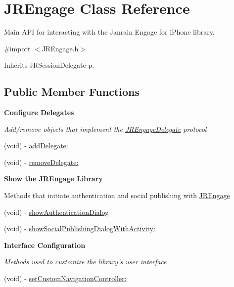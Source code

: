 \hypertarget{interface_j_r_engage}{
\section{JREngage Class Reference}
\label{interface_j_r_engage}
}


Main API for interacting with the Janrain Engage for iPhone library.  




{\ttfamily \#import $<$JREngage.h$>$}



Inherits JRSessionDelegate-\/p.

\subsection*{Public Member Functions}
\begin{Indent}{\bf Configure Delegates}\par
{\em \label{_amgrp3140c41a20ac51608ddd4bec38533a8f}
 Add/remove objects that implement the \hyperlink{protocol_j_r_engage_delegate-p}{JREngageDelegate} protocol }\begin{DoxyCompactItemize}
\item 
(void) -\/ \hyperlink{interface_j_r_engage_a18377ffb55f821587e6d38b3489692e8}{addDelegate:}
\item 
(void) -\/ \hyperlink{interface_j_r_engage_ab3f12ac148ea0f6df4d7ff7789cc7c94}{removeDelegate:}
\end{DoxyCompactItemize}
\end{Indent}
\begin{Indent}{\bf Show the JREngage Library}\par
{\em \label{_amgrpf9e79eb521c10019ba1736bc57a0355e}
 \label{interface_j_r_engage_showMethods}
\hypertarget{interface_j_r_engage_showMethods}{}


Methods that initiate authentication and social publishing with \hyperlink{interface_j_r_engage}{JREngage} }\begin{DoxyCompactItemize}
\item 
(void) -\/ \hyperlink{interface_j_r_engage_a01ecdff491f91543e18f33d0e565b046}{showAuthenticationDialog}
\item 
(void) -\/ \hyperlink{interface_j_r_engage_afca7b5ab9a57edc1a460aaec882207c4}{showSocialPublishingDialogWithActivity:}
\end{DoxyCompactItemize}
\end{Indent}
\begin{Indent}{\bf Interface Configuration}\par
{\em \label{_amgrp00fa0273ca94dfb558ecec1aea8440b2}
 Methods used to customize the library's user interface }\begin{DoxyCompactItemize}
\item 
(void) -\/ \hyperlink{interface_j_r_engage_a6c704bbff377d20603e6b52bd0ae17f1}{setCustomNavigationController:}
\end{DoxyCompactItemize}
\end{Indent}
